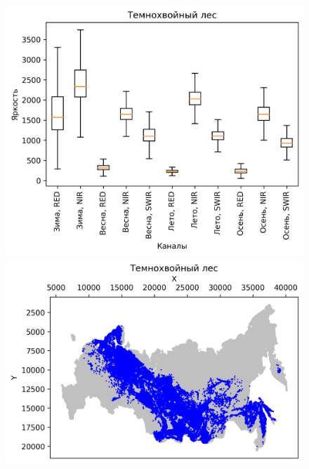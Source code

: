 \documentclass[14pt, a4paper, oneside]{extarticle}
\begin{document}
\begin{figure}[H]
    \centering
    \includegraphics[]{class-1-boxplot}
    \includegraphics[]{class-1-map}
\end{figure}
\end{document}
